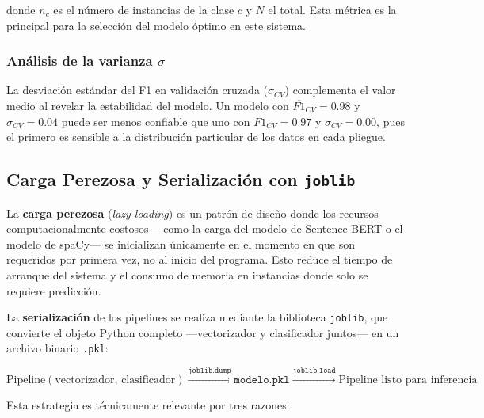 donde $n_c$ es el número de instancias de la clase $c$ y $N$ el total. Esta
métrica es la principal para la selección del modelo óptimo en este sistema.

\subsubsection*{Análisis de la varianza $\sigma$}

La desviación estándar del F1 en validación cruzada ($\sigma_{CV}$) complementa
el valor medio al revelar la estabilidad del modelo. Un modelo con
$\overline{F1}_{CV} = 0.98$ y $\sigma_{CV} = 0.04$ puede ser menos confiable
que uno con $\overline{F1}_{CV} = 0.97$ y $\sigma_{CV} = 0.00$, pues el
primero es sensible a la distribución particular de los datos en cada pliegue.

\subsection{Carga Perezosa y Serialización con \texttt{joblib}}

La \textbf{carga perezosa} (\textit{lazy loading}) es un patrón de diseño donde
los recursos computacionalmente costosos —como la carga del modelo de
Sentence-BERT o el modelo de spaCy— se inicializan únicamente en el momento en
que son requeridos por primera vez, no al inicio del programa. Esto reduce el
tiempo de arranque del sistema y el consumo de memoria en instancias donde solo
se requiere predicción.

La \textbf{serialización} de los pipelines se realiza mediante la biblioteca
\texttt{joblib}, que convierte el objeto Python completo —vectorizador y
clasificador juntos— en un archivo binario \texttt{.pkl}:

\begin{equation*}
  \text{Pipeline}(\text{vectorizador},\, \text{clasificador})
  \xrightarrow{\texttt{joblib.dump}}
  \texttt{modelo.pkl}
  \xrightarrow{\texttt{joblib.load}}
  \text{Pipeline listo para inferencia}
\end{equation*}

Esta estrategia es técnicamente relevante por tres razones:

